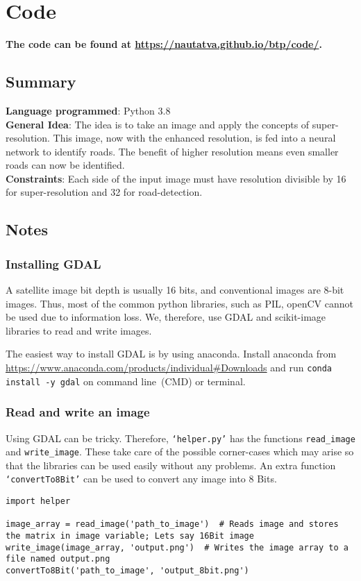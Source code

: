 \chapter{Code}\label{chapt:code}
\textbf{The code can be found at \url{https://nautatva.github.io/btp/code/}.}

\section{Summary}
\textbf{Language programmed}: Python 3.8 \bigskip \\
\textbf{General Idea}: The idea is to take an image and apply the concepts of super-resolution. This image, now with the enhanced resolution, is fed into a neural network to identify roads. The benefit of higher resolution means even smaller roads can now be identified. \bigskip \\
\textbf{Constraints}: Each side of the input image must have resolution divisible by 16 for super-resolution and 32 for road-detection.


\section{Notes}
\subsection{Installing GDAL}
A satellite image bit depth is usually 16 bits, and conventional images are 8-bit images. Thus, most of the common python libraries, such as PIL, openCV cannot be used due to information loss. We, therefore, use GDAL and scikit-image libraries to read and write images.

The easiest way to install GDAL is by using anaconda. Install anaconda from \url{https://www.anaconda.com/products/individual#Downloads} and run \texttt{conda install -y gdal} on command line~(CMD) or terminal.


\subsection{Read and write an image}
Using GDAL can be tricky. Therefore, \texttt{`helper.py'} has the functions \texttt{read\_image} and \texttt{write\_image}. These take care of the possible corner-cases which may arise so that the libraries can be used easily without any problems. An extra function \texttt{`convertTo8Bit'} can be used to convert any image into 8 Bits.

\begin{verbatim}
import helper

image_array = read_image('path_to_image')  # Reads image and stores the matrix in image variable; Lets say 16Bit image
write_image(image_array, 'output.png')  # Writes the image array to a file named output.png
convertTo8Bit('path_to_image', 'output_8bit.png')
\end{verbatim}



